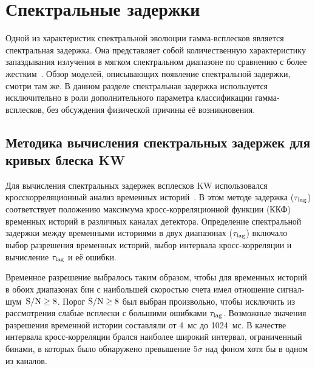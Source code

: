 \FloatBarrier

\section{Спектральные задержки}\label{sec:Lags}
Одной из характеристик спектральной эволюции гамма-всплесков является спектральная задержка.
Она представляет собой количественную характеристику запаздывания излучения в 
мягком спектральном диапазоне по сравнению с более жестким~\citep[см., например,][Глава~3]{Minaev_PhD}.
Обзор моделей, описывающих появление спектральной задержки, смотри там же.
В данном разделе спектральная задержка используется исключительно в роли дополнительного 
параметра классификации гамма-всплесков, без обсуждения физической причины её возникновения. 

\subsection{Методика вычисления спектральных задержек для кривых блеска KW}
Для вычисления спектральных задержек всплесков KW использовался 
кросскорреляционный анализ временных историй~\citep{Band_1997ApJ, Norris_2000}. 
В этом методе задержка ($\tau_{\mathrm{lag}}$) соответствует положению максимума 
кросс-корреляционной функции (ККФ) временных историй в различных каналах детектора.
Определение спектральной задержки между временными историями в двух диапазонах ($\tau_{\mathrm{lag}}$) 
включало выбор разрешения временных историй, выбор интервала кросс-корреляции 
и вычисление $\tau_{\mathrm{lag}}$ и её ошибки. 

Временное разрешение выбралось таким образом, чтобы для временных историй 
в обоих диапазонах бин с наибольшей скоростью счета имел отношение сигнал-шум~${\mathrm{S/N}} \geq 8$. 
Порог ${\mathrm{S/N}} \geq 8$ был выбран произвольно, чтобы исключить из рассмотрения 
слабые всплески с большими ошибками $\tau_{\mathrm{lag}}$. Возможные значения разрешения 
временной истории составляли от 4~мс до 1024~мс.
В качестве интервала кросс-корреляции брался наиболее широкий интервал, ограниченный
бинами, в которых было обнаружено превышение $5\sigma$ над фоном хотя бы в одном из каналов. 

